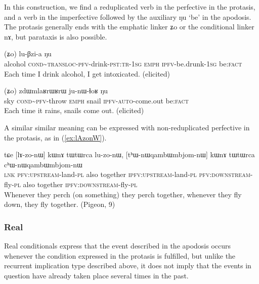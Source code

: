 \documentclass[oldfontcommands,oneside,a4paper,11pt]{article}
\newcommand{\ipa}[1]{{\phon \mbox{#1}}} %
\newcommand{\refb}[1]{(\ref{#1})}
\begin{document}
In this construction, we find a reduplicated verb in the perfective  in the protasis, and a verb in the imperfective followed by the auxiliary \ipa{ŋu} `be'   in the apodosis. The protasis generally ends with the emphatic linker \ipa{ʑo} or the conditional linker \ipa{nɤ}, but parataxis is also possible.

     \begin{exe}
   \ex \label{ex:CWCkAtshita}
   \gll
[\ipa{cʰa}   	\textbf{\ipa{ɕɯ\textasciitilde{}ɕ-kɤ-tsʰi-t-a}}]   	(\ipa{ʑo})   	\ipa{lu-βzi-a}   	\ipa{ŋu}   \\
alcohol \textsc{cond\textasciitilde{}transloc-pfv}-drink-\textsc{pst:tr-1sg} \textsc{emph} \textsc{ipfv}-be.drunk-\textsc{1sg} be:\textsc{fact} \\
\glt Each time I drink alcohol, I get intoxicated. (elicited)
\end{exe}

     \begin{exe}
   \ex \label{ex:tWmW.kWkAlAt}
   \gll
[\ipa{tɯmɯ}   \textbf{	\ipa{kɯ\textasciitilde{}ka-lɤt}}]   	(\ipa{ʑo})   	\ipa{zdɯmlaʁrɯʁrɯ}   	\ipa{ju-nɯ-ɬoʁ}   	\ipa{ŋu}   \\
sky \textsc{cond\textasciitilde{}pfv}-throw \textsc{emph} snail \textsc{ipfv-auto}-come.out be:\textsc{fact} \\
\glt Each time it rains,  snails come out. (elicited)
\end{exe}

A similar similar meaning can be expressed with non-reduplicated perfective in the protasis, as in \refb{ex:lAzonW}.

     \begin{exe}
\ex \label{ex:lAzonW}
\gll
\ipa{tɕe} 	[\ipa{lɤ-zo-nɯ}] 	\ipa{kɯnɤ} 	\ipa{tɯtɯrca} 	\ipa{lu-zo-nɯ,} 	[\ipa{tʰɯ-nɯqambɯmbjom-nɯ}] 	\ipa{kɯnɤ} 	\ipa{tɯtɯrca} 	\ipa{cʰɯ-nɯqambɯmbjom-nɯ}  \\
\textsc{lnk} \textsc{pfv:upstream}-land-\textsc{pl} also together \textsc{ipfv:upstream}-land-\textsc{pl} \textsc{pfv:downstream}-fly-\textsc{pl} also together \textsc{ipfv:downstream}-fly-\textsc{pl}  \\
\glt Whenever they perch (on something) they perch together, whenever they fly down, they fly together. (Pigeon, 9)
\end{exe}

\subsubsection{Real} \label{sec:real.conditional}
Real conditionals express that the event described in the apodosis occurs whenever the condition expressed in the protasis is fulfilled, but unlike the recurrent implication type described above, it does not imply that the events in question have already taken place several times in the past.
\end{document}
